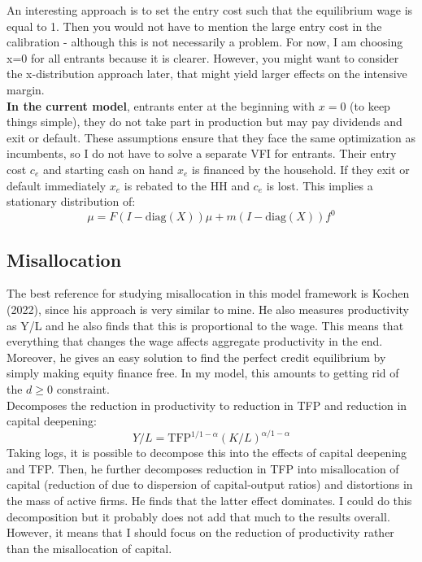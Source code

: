 \documentclass[12pt]{article}
\begin{document}
An interesting approach is to set the entry cost such that the equilibrium wage is equal to 1. Then you would not have to mention the large entry cost in the calibration - although this is not necessarily a problem. For now, I am choosing x=0 for all entrants because it is clearer. However, you might want to consider the x-distribution approach later, that might yield larger effects on the intensive margin. \vspace{3mm} \\
\textbf{In the current model}, entrants enter at the beginning with $x = 0$ (to keep things simple), they do not take part in production but may pay dividends and exit or default. These assumptions ensure that they face the same optimization as incumbents, so I do not have to solve a separate VFI for entrants. Their entry cost $c_e$ and starting cash on hand $x_e$ is financed by the household. If they exit or default immediately $x_e$ is rebated to the HH and $c_e$ is lost. This implies a stationary distribution of:
$$ \mu = F(I-\text{diag}(X)) \mu + m(I-\text{diag}(X))f^0 $$

\subsection*{Misallocation}

The best reference for studying misallocation in this model framework is Kochen (2022), since his approach is very similar to mine. He also measures productivity as Y/L and he also finds that this is proportional to the wage. This means that everything that changes the wage affects aggregate productivity in the end. Moreover, he gives an easy solution to find the perfect credit equilibrium by simply making equity finance free. In my model, this amounts to getting rid of the $d \geq 0$ constraint.  \vspace{3mm} \\ 
Decomposes the reduction in productivity to reduction in TFP and reduction in capital deepening: 
$$ Y/L = \text{TFP}^{1/1-\alpha}(K/L)^{\alpha/1-\alpha} $$
Taking logs, it is possible to decompose this into the effects of capital deepening and TFP. Then, he further decomposes reduction in TFP into misallocation of capital (reduction of due to dispersion of capital-output ratios) and distortions in the mass of active firms. He finds that the latter effect dominates. I could do this decomposition but it probably does not add that much to the results overall. However, it means that I should focus on the reduction of productivity rather than the misallocation of capital.
\end{document}
